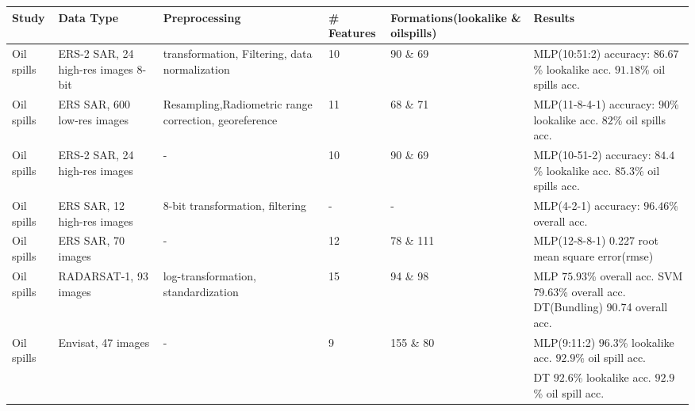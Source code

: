 \begin{table*}[t]

\advance\leftskip-3cm
\tabcolsep=0.19cm
\small
\centering


\begin{adjustbox}{width=\textwidth,totalheight=\textheight,keepaspectratio}
\begin{tabular}{*{6}{|l|}}

\toprule[1.5pt]
  \textbf{Study} & \textbf{Data Type} & \textbf{Preprocessing} & \# \textbf{Features} & \textbf{Formations(lookalike \& oilspills)} & \textbf{Results} \\
    \hline
     Oil spills\cite{Topouzelis200762} & ERS-2 SAR, 24 high-res images 8-bit & transformation, Filtering, data normalization & 10 & 90  \& 69  & MLP(10:51:2) accuracy: $86.67$\% lookalike acc. $91.18$\% oil spills acc.\\
        
        Oil spills\cite{Delfrate200038} & ERS SAR, 600 low-res images & Resampling,Radiometric range correction, georeference & 11 & 68  \& 71  & MLP(11-8-4-1) accuracy: $90$\% lookalike acc. $82$\% oil spills acc.\\
        
        Oil spills\cite{Topouzelis200930} &  ERS-2 SAR, 24 high-res images & - & 10 & 90 \& 69  & MLP(10-51-2) accuracy: $84.4$\% lookalike acc. $85.3$\% oil spills acc.\\
        
        Oil spills\cite{Topouzelis200924} &  ERS SAR, 12 high-res images & 8-bit transformation, filtering & - & - & MLP(4-2-1) accuracy: $96.46$\% overall acc. \\
     
        Oil spills\cite{Delfrate2004} &  ERS SAR, 70 images & - & 12 & 78 \& 111  & MLP(12-8-8-1) 0.227 root mean square error(rmse)\\
        
        Oil spills\cite{Xu201414} &  RADARSAT-1, 93 images & log-transformation, standardization & 15 & 94  \& 98  & MLP $75.93$\% overall acc. SVM $79.63$\% overall acc. DT(Bundling) 90.74 overall acc.\\
        
        Oil spills\cite{Mera201472} &  Envisat, 47 images & - & 9 & 155  \& 80  & MLP(9:11:2) $96.3$\% lookalike acc. $92.9$\% oil spill acc. \\
        & & & & & DT $92.6$\% lookalike acc. $92.9$\% oil spill acc. \\
        

\end{tabular}
\end{adjustbox}
\end{table*}
